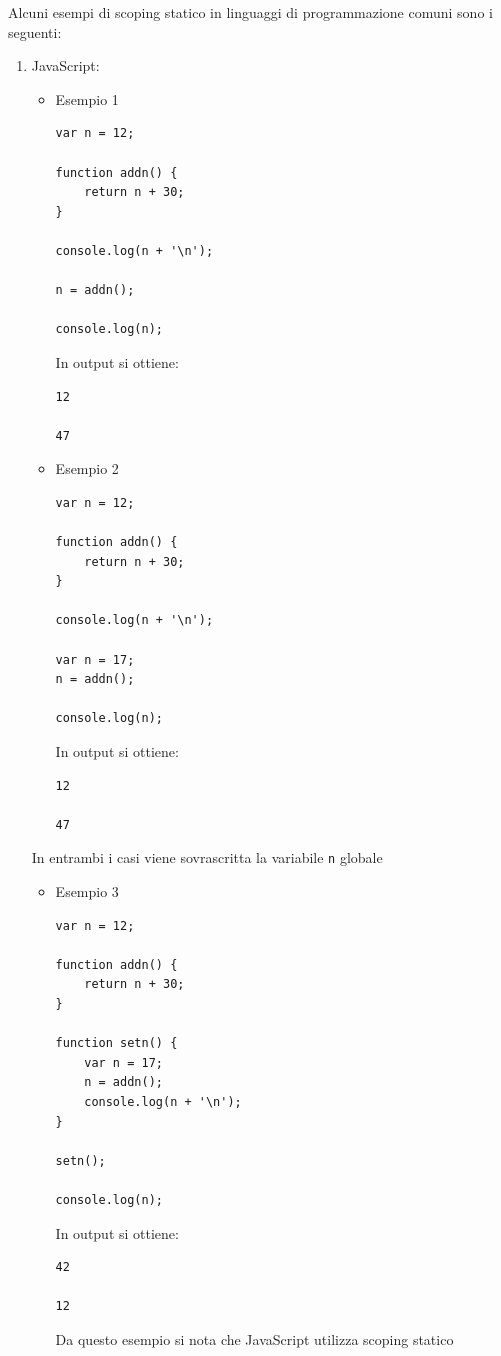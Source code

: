\documentclass[a4paper]{article}
\begin{document}
\vspace{1em}
\noindent
\begin{example}
  Alcuni esempi di scoping statico in linguaggi di programmazione comuni sono i seguenti:
  \begin{enumerate}
    \item JavaScript:
      \begin{itemize}
        \item Esempio 1
\begin{lstlisting}
var n = 12;

function addn() {
    return n + 30;
}

console.log(n + '\n');

n = addn();

console.log(n);
\end{lstlisting}
          In output si ottiene:
\begin{lstlisting}
12

47
\end{lstlisting}

        \item Esempio 2
\begin{lstlisting}
var n = 12;

function addn() {
    return n + 30;
}

console.log(n + '\n');

var n = 17;
n = addn();

console.log(n);
\end{lstlisting}
          In output si ottiene:
\begin{lstlisting}
12

47
\end{lstlisting}
      \end{itemize}
      In entrambi i casi viene sovrascritta la variabile \texttt{n} globale
      \begin{itemize}
        \item Esempio 3
\begin{lstlisting}
var n = 12;

function addn() {
    return n + 30;
}

function setn() {
    var n = 17;
    n = addn();
    console.log(n + '\n');
}

setn();

console.log(n);
\end{lstlisting}
          In output si ottiene:
\begin{lstlisting}
42

12
\end{lstlisting}
          Da questo esempio si nota che JavaScript utilizza scoping statico
      \end{itemize}


\end{enumerate}
\end{example}
\end{document}

